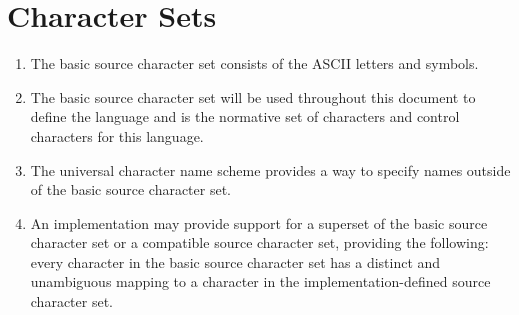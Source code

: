 \section{Character Sets}

\begin{enumerate}
	\item The basic source character set consists of the ASCII letters and symbols.
	\item The basic source character set will be used throughout this document to define the language and is the normative set of characters and control characters for this language.
	\item The universal character name scheme provides a way to specify names outside of the basic source character set.
	\item An implementation may provide support for a superset of the basic source character set or a compatible source character set, providing the following: every character in the basic source character set has a distinct and unambiguous mapping to a character in the implementation-defined source character set.
\end{enumerate}